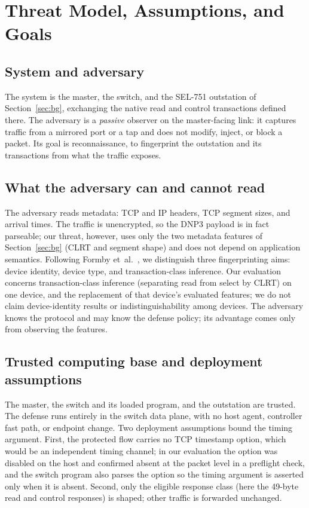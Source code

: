 \section{Threat Model, Assumptions, and Goals}
\label{sec:threat}

\subsection{System and adversary}
The system is the master, the switch, and the SEL-751 outstation of Section~\ref{sec:bg}, exchanging
the native read and control transactions defined there. The adversary is a \emph{passive} observer on
the master-facing link: it captures traffic from a mirrored port or a tap and does not modify, inject,
or block a packet. Its goal is reconnaissance, to fingerprint the outstation and its transactions from
what the traffic exposes.

\subsection{What the adversary can and cannot read}
The adversary reads metadata: TCP and IP headers, TCP segment sizes, and arrival times. The traffic is
unencrypted, so the DNP3 payload is in fact parseable; our threat, however, uses only the two
metadata features of Section~\ref{sec:bg} (CLRT and segment shape) and does not depend on application
semantics. Following Formby et~al.~\cite{formby2016}, we distinguish three fingerprinting aims: device
identity, device type, and transaction-class inference. Our evaluation concerns transaction-class
inference (separating read from select by CLRT) on one device, and the replacement of that device's
evaluated features; we do not claim device-identity results or indistinguishability among devices. The
adversary knows the protocol and may know the defense policy; its advantage comes only from observing
the features.

\subsection{Trusted computing base and deployment assumptions}
The master, the switch and its loaded program, and the outstation are trusted. The defense runs
entirely in the switch data plane, with no host agent, controller fast path, or endpoint change. Two
deployment assumptions bound the timing argument. First, the protected flow carries no TCP timestamp
option, which would be an independent timing channel; in our evaluation the option was disabled on the
host and confirmed absent at the packet level in a preflight check, and the switch program also parses
the option so the timing argument is asserted only when it is absent. Second, only the eligible
response class (here the 49-byte read and control responses) is shaped; other traffic is forwarded
unchanged.

